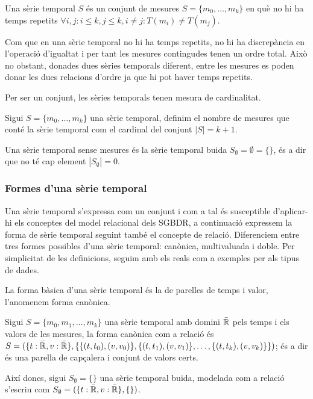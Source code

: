 \begin{definition}
  \label{def:serie_temporal}
  Una sèrie temporal $S$ és un conjunt de mesures
  $S=\{m_0,\ldots,m_k\}$ en què no hi ha temps repetits
  $\forall i,j: i\leq k, j\leq k, i\neq j : T(m_i)\neq T(m_j)$.
\end{definition}


Com que en una sèrie temporal no hi ha temps repetits, no hi ha
discrepància en l'operació d'igualtat i per tant les mesures
contingudes tenen un ordre total. Això no obstant, donades dues sèries
temporals diferent, entre les mesures es poden donar les dues
relacions d'ordre ja que hi pot haver temps repetits.



Per ser un conjunt, les sèries temporals tenen mesura de cardinalitat.
\begin{definition}[Cardinal]
  Sigui $S=\{m_0,\ldots,m_k\}$ una sèrie temporal, definim el nombre
  de mesures que conté la sèrie temporal com el cardinal del conjunt
  $|S|=k+1$. 
\end{definition}

Una sèrie temporal sense mesures és la sèrie temporal buida
$S_\emptyset= \emptyset = \{\}$, és a dir que no té cap element
$|S_\emptyset|=0$.

 


\subsubsection{Formes d'una sèrie temporal}


Una sèrie temporal s'expressa com un conjunt i com a tal és
susceptible d'aplicar-hi els conceptes del model relacional dels
\gls{SGBDR}, a continuació
expressem la forma de sèrie temporal seguint també el concepte de
relació. Diferenciem entre tres formes possibles d'una sèrie temporal:
canònica, multivaluada i doble.  Per simplicitat de les definicions,
seguim amb els reals com a exemples per als tipus de dades.


La forma bàsica d'una sèrie temporal és la de parelles de temps i
valor, l'anomenem forma canònica. 
\begin{definition}
  Sigui $S = \{ m_0, m_1 , \dotsc, m_k \}$ una sèrie temporal amb
  domini $\bar{\mathbb{R}{}}$ pels temps i els valors de les mesures, la forma
  canònica com a relació és $S = ( \{t: \bar{\mathbb{R}{}}, v:
  \bar{\mathbb{R}{}}\}, \{ \{ (t,t_0),(v,v_0)\}, \{(t,t_1),(v,v_1)\}, \dotsc,
  \{(t,t_k),(v,v_k)\} \} )$; és a dir és una parella de capçalera i conjunt de
  valors certs. 

  Així doncs, sigui $S_{\emptyset} = \{ \}$ una sèrie temporal buida,
  modelada com a relació s'escriu com $S_{\emptyset} = ( \{t:
  \bar{\mathbb{R}{}}, v: \bar{\mathbb{R}{}}\}, \{ \} )$.
\end{definition}


